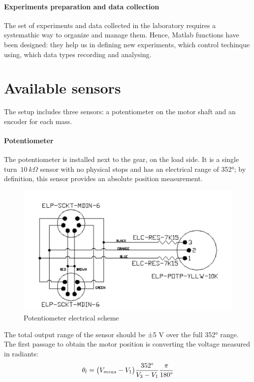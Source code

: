 
\paragraph{Experiments preparation and data collection}

The set of experiments and data collected in the laboratory requires a systemathic way to organize and manage them. Hence, Matlab functions have been designed: they help us in defining new experiments, which control techinque using, which data types recording and analysing.

\section{Available sensors}

The setup includes three sensors: a potentiometer on the motor shaft and an encoder for each mass.

\paragraph{Potentiometer}

The potentiometer is installed next to the gear, on the load side. It is a single turn~$10 \ k\Omega$ sensor with no physical stops and has an electrical range of 352°; by definition, this sensor provides an absolute position measurement. \\
\begin{figure}[h]
	\centering
	\includegraphics[width=0.4\columnwidth]{images/sensors/potentiometer_scheme}
	\caption{Potentiometer electrical scheme}
\end{figure}

The total output range of the sensor should be ±5 V over the full 352° range.
The first passage to obtain the motor position is converting the voltage measured in radiants:
\[
	\theta_l = \bigl{(} V_{meas} - V_1 \bigr{)} \frac{352 \degree }{V_3 - V_1} \frac{\pi}{180 \degree }
\]

